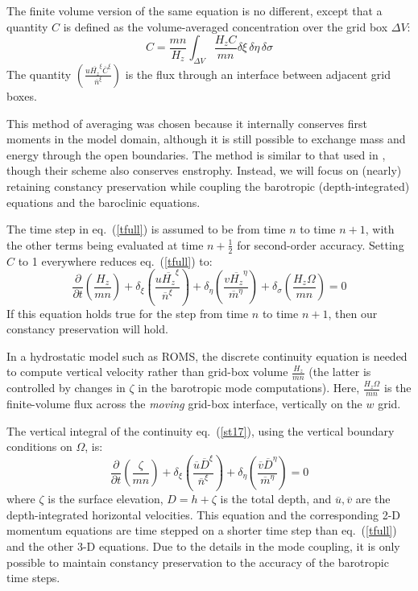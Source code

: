 The finite volume version of the same equation is no different,
except that a quantity $C$ is defined as the volume-averaged
concentration over the grid box $\Delta V$:
\begin{equation}
   C = \frac{mn}{H_z} \int_{\Delta V} \frac{H_z C}{mn} \delta \xi
   \, \delta \eta \, \delta \sigma
\end{equation}
The quantity  $\left(
\frac{u \overline{H_z}^\xi \overline{C}^\xi}{\overline{n}^\xi} \right)$
is the flux through an interface between adjacent grid boxes.

This method of averaging was chosen because it internally conserves
first moments in the model domain, although it is still possible to
exchange mass and energy through the open boundaries. The method is
similar to that used in \citet{AL}, though their
scheme also conserves enstrophy. Instead, we will focus on (nearly) retaining
constancy preservation while coupling the barotropic
(depth-integrated) equations and the baroclinic equations.

The time step in eq.~(\ref{tfull}) is assumed to be from time $n$ to
time $n+1$, with the other terms being evaluated at time
$n+\frac{1}{2}$ for second-order accuracy.
Setting $C$ to 1 everywhere reduces eq.~(\ref{tfull}) to:
\begin{equation}
   \frac{\partial}{\partial t} \left( \frac{H_z}{m n} \right)
   + \delta_{\xi} \left(
   \frac{u \overline{H_z}^\xi }{\overline{n}^\xi} \right)
   + \delta_{\eta} \left(
   \frac{v \overline{H_z}^\eta}{\overline{m}^\eta} \right)
   + \delta_\sigma \left( 
   \frac{H_z \Omega}{m n} \right) = 0
\label{contfull}
\end{equation}
If this equation holds true for the step from time $n$ to time $n+1$, then
our constancy preservation will hold.

In a hydrostatic model such as ROMS, the discrete continuity
equation is needed to compute vertical velocity rather than grid-box
volume $\frac{H_z}{m n}$ (the latter is controlled by changes in
$\zeta$ in the barotropic mode computations). Here, $\frac{H_z
\Omega}{m n}$ is the finite-volume flux across the {\em moving}
grid-box interface, vertically on the $w$ grid.

The vertical integral of the continuity eq.~(\ref{st17}), using
the vertical boundary conditions on $\Omega$, is:
\begin{equation}
   \frac{\partial}{\partial t} \left( \frac{\zeta}{mn} \right) +
   \delta_{\xi} \left(
   \frac{\overline{u} \overline{D}^\xi }{\overline{n}^\xi} \right)
   + \delta_{\eta} \left(
   \frac{\overline{v} \overline{D}^\eta}{\overline{m}^\eta} \right)
   = 0
\label{zeta1}
\end{equation}
where $\zeta$ is the surface elevation, $D= h+\zeta$ is the total
depth, and $\overline{u},\overline{v}$ are the depth-integrated
horizontal velocities. This equation and the corresponding 2-D
momentum equations are time stepped on a shorter time step than 
eq.~(\ref{tfull}) and the other 3-D equations. Due to the details in
the mode coupling, it is only possible to maintain constancy
preservation to the accuracy of the barotropic time steps.

